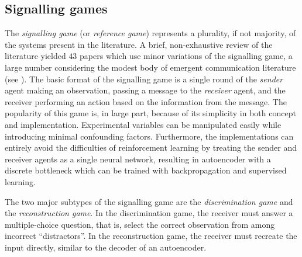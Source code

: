 \subsection{Signalling games}
\unskip\label{elcc:sec:signalling}
The \emph{signalling game} (or \emph{reference game}) \citep{lewis1970ConventionAP} represents a plurality, if not majority, of the systems present in the literature.
A brief, non-exhaustive review of the literature yielded $43$ papers which use minor variations of the signalling game, a large number considering the modest body of emergent communication literature (see ).
The basic format of the signalling game is a single round of the \emph{sender} agent making an observation, passing a message to the \emph{receiver} agent, and the receiver performing an action based on the information from the message.
The popularity of this game is, in large part, because of its simplicity in both concept and implementation.
Experimental variables can be manipulated easily while introducing minimal confounding factors.
Furthermore, the implementations can entirely avoid the difficulties of reinforcement learning by treating the sender and receiver agents as a single neural network, resulting in autoencoder with a discrete bottleneck which can be trained with backpropagation and supervised learning. 

The two major subtypes of the signalling game are the \emph{discrimination game} and the \emph{reconstruction game}.
In the discrimination game, the receiver must answer a multiple-choice question, that is, select the correct observation from among incorrect ``distractors''.
In the reconstruction game, the receiver must recreate the input directly, similar to the decoder of an autoencoder.

